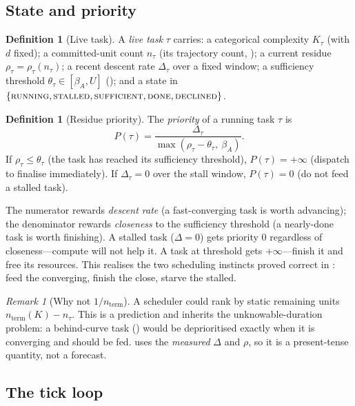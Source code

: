 \documentclass[twocolumn,10pt,a4paper]{article}
\theoremstyle{thmstyle}
\theoremstyle{definition}
\newtheorem{definition}[theorem]{Definition}
\theoremstyle{remark}
\newtheorem{remark}[theorem]{Remark}
\newcommand{\floor}{\beta}
\newcommand{\res}{\rho}
\newcommand{\task}{\tau}
\begin{document}
\subsection{State and priority}

\begin{definition}[Live task]
\label{def:livetask}
A \emph{live task} $\task$ carries: a categorical complexity $K_\task$
(with $d$ fixed); a committed-unit count $n_\task$ (its trajectory count,
); a current residue $\res_\task=\res_\task(n_\task)$; a
recent descent rate $\Delta_\task$ over a fixed window; a sufficiency
threshold $\theta_\task\in[\floor_A,U]$ (); and a
state in $\{\textsc{running},\textsc{stalled},\textsc{sufficient},
\textsc{done},\textsc{declined}\}$.
\end{definition}

\begin{definition}[Residue priority]
\label{def:priority}
The \emph{priority} of a running task $\task$ is
\[
P(\task)=
\frac{\Delta_\task}{\max(\res_\task-\theta_\task,\ \floor_A)} .
\]
If $\res_\task\le\theta_\task$ (the task has reached its sufficiency
threshold), $P(\task)=+\infty$ (dispatch to finalise immediately). If
$\Delta_\task=0$ over the stall window, $P(\task)=0$ (do not feed a
stalled task).
\end{definition}

The numerator rewards \emph{descent rate} (a fast-converging task is
worth advancing); the denominator rewards \emph{closeness} to the
sufficiency threshold (a nearly-done task is worth finishing). A stalled
task ($\Delta=0$) gets priority $0$ regardless of closeness---compute
will not help it. A task at threshold gets $+\infty$---finish it and free
its resources. This realises the two scheduling instincts proved correct
in : feed the converging, finish the close, starve the
stalled.

\begin{remark}[Why not $1/n_{\mathrm{term}}$]
\label{rem:not-static}
A scheduler could rank by static remaining units
$n_{\mathrm{term}}(K)-n_\task$. This is a prediction and inherits the
unknowable-duration problem: a behind-curve task ()
would be deprioritised exactly when it is converging and should be fed.
 uses the \emph{measured} $\Delta$ and $\res$, so it is
a present-tense quantity, not a forecast.
\end{remark}

\subsection{The tick loop}
\end{document}
